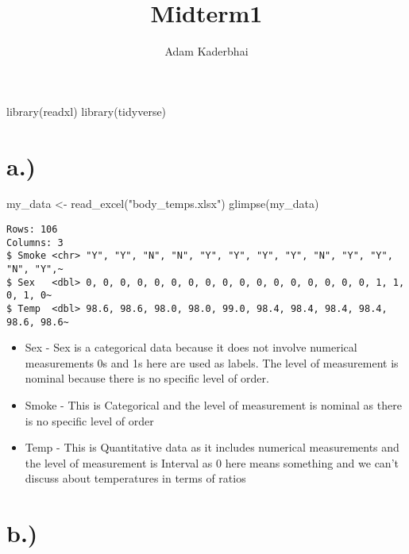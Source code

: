 \documentclass[
  letterpaper,
  DIV=11,
  numbers=noendperiod]{scrartcl}
\title{Midterm1}
\author{Adam Kaderbhai}
\date{}
\newenvironment{Shaded}{\begin{snugshade}}{\end{snugshade}}
\newcommand{\FunctionTok}[1]{\textcolor[rgb]{0.28,0.35,0.67}{#1}}
\newcommand{\NormalTok}[1]{\textcolor[rgb]{0.00,0.23,0.31}{#1}}
\newcommand{\OtherTok}[1]{\textcolor[rgb]{0.00,0.23,0.31}{#1}}
\newcommand{\StringTok}[1]{\textcolor[rgb]{0.13,0.47,0.30}{#1}}
\begin{document}
\maketitle


\begin{Shaded}
\begin{Highlighting}[]
\FunctionTok{library}\NormalTok{(readxl)}
\FunctionTok{library}\NormalTok{(tidyverse)}
\end{Highlighting}
\end{Shaded}

\section{a.)}\label{a.}

\begin{Shaded}
\begin{Highlighting}[]
\NormalTok{my\_data }\OtherTok{\textless{}{-}} \FunctionTok{read\_excel}\NormalTok{(}\StringTok{"body\_temps.xlsx"}\NormalTok{)}
\FunctionTok{glimpse}\NormalTok{(my\_data)}
\end{Highlighting}
\end{Shaded}

\begin{verbatim}
Rows: 106
Columns: 3
$ Smoke <chr> "Y", "Y", "N", "N", "Y", "Y", "Y", "Y", "N", "Y", "Y", "N", "Y",~
$ Sex   <dbl> 0, 0, 0, 0, 0, 0, 0, 0, 0, 0, 0, 0, 0, 0, 0, 0, 0, 1, 1, 0, 1, 0~
$ Temp  <dbl> 98.6, 98.6, 98.0, 98.0, 99.0, 98.4, 98.4, 98.4, 98.4, 98.6, 98.6~
\end{verbatim}

\begin{itemize}
\item
  Sex - Sex is a categorical data because it does not involve numerical
  measurements 0s and 1s here are used as labels. The level of
  measurement is nominal because there is no specific level of order.
\item
  Smoke - This is Categorical and the level of measurement is nominal as
  there is no specific level of order
\item
  Temp - This is Quantitative data as it includes numerical measurements
  and the level of measurement is Interval as 0 here means something and
  we can't discuss about temperatures in terms of ratios
  
  
  
\end{itemize}


\section{b.)}\label{b.}
\end{document}
